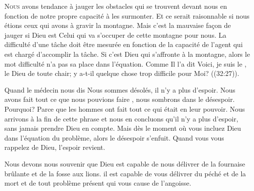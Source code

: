 \dvrule







\lettrine{N}{ous} avons tendance à jauger les obstacles
 qui se trouvent devant nous en fonction de notre propre capacité
 à les surmonter.
 Et ce serait raisonnable si nous étions ceux qui avons
 à gravir la montagne. Mais c'est la mauvaise fa\c{c}on de jauger
 si Dieu est Celui qui va s'occuper de cette montagne pour nous.
 La difficulté d'une tâche doit être mesurée en fonction de la capacité
 de l'agent qui est chargé d'accomplir la tâche.
 Si c'est Dieu qui s'affronte à la montagne, alors le mot
 \Og difficulté \Fg{} n'a pas sa place dans l'équation.
 Comme Il l'a dit\frcolon{} 
 \Og Voici, je suis le \Seigneur, le Dieu de toute chair;
 y a-t-il quelque chose trop difficile pour Moi? \Fg{}
 ((32:27)). 


Quand le médecin nous dis\frcolon{} 
 \Og Nous sommes désolés, il n'y a plus d'espoir.
 Nous avons fait tout ce que nous pouvions faire \Fg{},
 nous sombrons dans le désespoir. Pourquoi?
 Parce que les hommes ont fait tout ce qui était en leur pouvoir.
 Nous arrivons à la fin de cette phrase et nous en concluons
 qu'il n'y a plus d'espoir, sans jamais prendre Dieu en compte.
 Mais dès le moment où vous incluez Dieu
 dans l'équation du problème, alors le désespoir s'enfuit.
 Quand vous vous rappelez de Dieu, l'espoir revient. 

Nous devons nous souvenir que Dieu est capable de nous délivrer
 de la fournaise brûlante et de la fosse aux lions.
 il est capable de vous délivrer du péché et de la mort
 \ocadr et de tout problème présent qui vous cause de l'angoisse.

